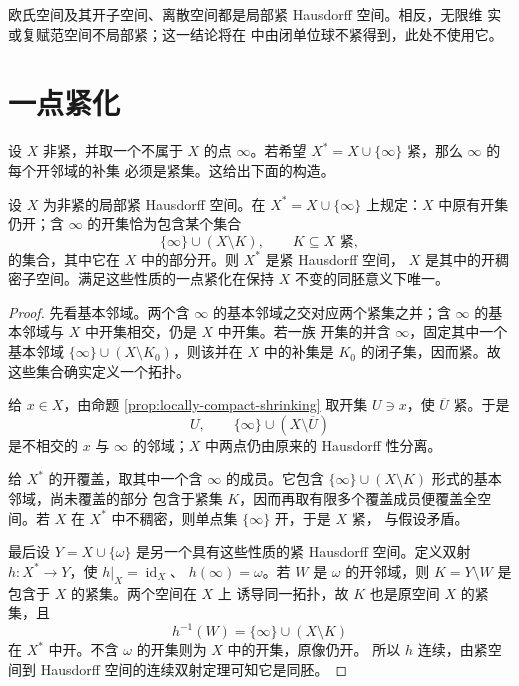 欧氏空间及其开子空间、离散空间都是局部紧 Hausdorff 空间。相反，无限维
实或复赋范空间不局部紧；这一结论将在
中由闭单位球不紧得到，此处不使用它。

\section{一点紧化}

设 \(X\) 非紧，并取一个不属于 \(X\) 的点 \(\infty\)。若希望
\(X^*=X\cup\{\infty\}\) 紧，那么 \(\infty\) 的每个开邻域的补集
必须是紧集。这给出下面的构造。

\begin{theorem}[一点紧化]
\label{thm:one-point-compactification}
设 \(X\) 为非紧的局部紧 Hausdorff 空间。在
\(X^*=X\cup\{\infty\}\) 上规定：\(X\) 中原有开集仍开；含
\(\infty\) 的开集恰为包含某个集合
\[
 \{\infty\}\cup(X\setminus K),
 \qquad K\subseteq X\text{ 紧},
\]
的集合，其中它在 \(X\) 中的部分开。则 \(X^*\) 是紧 Hausdorff 空间，
\(X\) 是其中的开稠密子空间。满足这些性质的一点紧化在保持 \(X\)
不变的同胚意义下唯一。
\end{theorem}

\begin{proof}
先看基本邻域。两个含 \(\infty\) 的基本邻域之交对应两个紧集之并；含
\(\infty\) 的基本邻域与 \(X\) 中开集相交，仍是 \(X\) 中开集。若一族
开集的并含 \(\infty\)，固定其中一个基本邻域
\(\{\infty\}\cup(X\setminus K_0)\)，则该并在 \(X\) 中的补集是
\(K_0\) 的闭子集，因而紧。故这些集合确实定义一个拓扑。

给 \(x\in X\)，由命题 \ref{prop:locally-compact-shrinking} 取开集
\(U\ni x\)，使 \(\overline U\) 紧。于是
\[
 U,\qquad \{\infty\}\cup(X\setminus\overline U)
\]
是不相交的 \(x\) 与 \(\infty\) 的邻域；\(X\) 中两点仍由原来的
Hausdorff 性分离。

给 \(X^*\) 的开覆盖，取其中一个含 \(\infty\) 的成员。它包含
\(\{\infty\}\cup(X\setminus K)\) 形式的基本邻域，尚未覆盖的部分
包含于紧集 \(K\)，因而再取有限多个覆盖成员便覆盖全空间。若 \(X\)
在 \(X^*\) 中不稠密，则单点集 \(\{\infty\}\) 开，于是 \(X\) 紧，
与假设矛盾。

最后设 \(Y=X\cup\{\omega\}\) 是另一个具有这些性质的紧 Hausdorff
空间。定义双射 \(h:X^*\to Y\)，使 \(h|_X=\operatorname{id}_X\)、
\(h(\infty)=\omega\)。若 \(W\) 是 \(\omega\) 的开邻域，则
\(K=Y\setminus W\) 是包含于 \(X\) 的紧集。两个空间在 \(X\) 上
诱导同一拓扑，故 \(K\) 也是原空间 \(X\) 的紧集，且
\[
 h^{-1}(W)=\{\infty\}\cup(X\setminus K)
\]
在 \(X^*\) 中开。不含 \(\omega\) 的开集则为 \(X\) 中的开集，原像仍开。
所以 \(h\) 连续，由紧空间到 Hausdorff 空间的连续双射定理可知它是同胚。
\end{proof}

